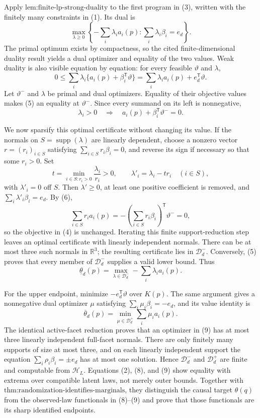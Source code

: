 Apply \(\text{lem:finite-lp-strong-duality}\) to the first program in (3), written with the finitely many constraints in (1).  Its dual is
\[
 \max_{\lambda\geq0}
 \left\{-\sum_i\lambda_i a_i(p):
             \sum_i\lambda_i\beta_i=e_d\right\}.       \tag{4}
\]
The primal optimum exists by compactness, so the cited finite-dimensional duality result yields a dual optimizer and equality of the two values.  Weak duality is also visible equation by equation: for every feasible \(\vartheta\) and \(\lambda\),
\[
 0\leq\sum_i\lambda_i\{a_i(p)+\beta_i^{\mathsf T}\vartheta\}
 =\sum_i\lambda_i a_i(p)+e_d^{\mathsf T}\vartheta.     \tag{5}
\]
Let \(\vartheta^-\) and \(\lambda\) be primal and dual optimizers.  Equality of their objective values makes (5) an equality at \(\vartheta^-\).  Since every summand on its left is nonnegative,
\[
 \lambda_i>0\quad\Longrightarrow\quad
 a_i(p)+\beta_i^{\mathsf T}\vartheta^-=0.              \tag{6}
\]

We now sparsify this optimal certificate without changing its value.  If the normals on \(S=\operatorname{supp}(\lambda)\) are linearly dependent, choose a nonzero vector \(r=(r_i)_{i\in S}\) satisfying \(\sum_{i\in S}r_i\beta_i=0\), and reverse its sign if necessary so that some \(r_i>0\).  Set
\[
 t=\min_{i\in S:r_i>0}\frac{\lambda_i}{r_i}>0,
 \qquad
 \lambda'_i=\lambda_i-tr_i\quad(i\in S),
\]
with \(\lambda'_i=0\) off \(S\).  Then \(\lambda'\geq0\), at least one positive coefficient is removed, and \(\sum_i\lambda'_i\beta_i=e_d\).  By (6),
\[
 \sum_{i\in S}r_i a_i(p)
 =-\left(\sum_{i\in S}r_i\beta_i\right)^{\mathsf T}\vartheta^-=0,             \tag{7}
\]
so the objective in (4) is unchanged.  Iterating this finite support-reduction step leaves an optimal certificate with linearly independent normals.  There can be at most three such normals in \(\mathbb R^3\); the resulting certificate lies in \(\mathcal D_d^-\).  Conversely, (5) proves that every member of \(\mathcal D_d^-\) supplies a valid lower bound.  Thus
\[
 \underline\theta_d(p)=
 \max_{\lambda\in\mathcal D_d^-}-\sum_i\lambda_i a_i(p).                    \tag{8}
\]

For the upper endpoint, minimize \(-e_d^{\mathsf T}\vartheta\) over \(K(p)\).  The same argument gives a nonnegative dual optimizer \(\mu\) satisfying \(\sum_i\mu_i\beta_i=-e_d\), and its value identity is
\[
 \overline\theta_d(p)=
 \min_{\mu\in\mathcal D_d^+}\sum_i\mu_i a_i(p).                            \tag{9}
\]
The identical active-facet reduction proves that an optimizer in (9) has at most three linearly independent full-facet normals.  There are only finitely many supports of size at most three, and on each linearly independent support the equation \(\sum_i\rho_i\beta_i=\pm e_d\) has at most one solution.  Hence \(\mathcal D_d^-\) and \(\mathcal D_d^+\) are finite and computable from \(\mathcal H_L\).  Equations (2), (8), and (9) show equality with extrema over compatible latent laws, not merely outer bounds.  Together with \(\text{thm:randomization-identifies-marginals}\), they distinguish the causal target \(\theta(q)\) from the observed-law functionals in (8)--(9) and prove that those functionals are its sharp identified endpoints.

